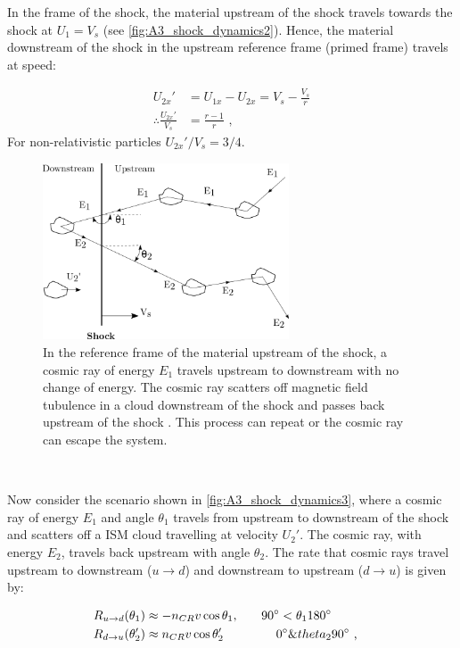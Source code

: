 In the frame of the shock, the material upstream of the shock travels towards the shock at $U_1=V_s$ (see \autoref{fig:A3_shock_dynamics2}). Hence, the material downstream of the shock in the upstream reference frame (primed frame) travels at speed:

\begin{equation}
    \begin{aligned}
        U_{2x}'&=U_{1x}-U_{2x} =V_s- \frac{V_s}{r} \\
        \therefore \frac{U_{2x}'}{V_s}&=\frac{r-1}{r}\text{ ,}
    \end{aligned} \label{eq:down_upstream_v_ratio}
\end{equation}
\noindent For non-relativistic particles ${U_{2x}'}/{V_s}=3/4$.
\begin{figure}
	\centering
	\includegraphics[width=0.65\textwidth]{A3_Diffusive_Shock_Acceleration/Images/dsa.png}
	\caption{In the reference frame of the material upstream of the shock, a cosmic ray of energy $E_1$ travels upstream to downstream with no change of energy. The cosmic ray scatters off magnetic field tubulence in a  cloud downstream of the shock and passes back upstream of the shock . This process can repeat or the cosmic ray can escape the system.}
	\label{fig:A3_shock_dynamics3}
\end{figure}
\par~\par 
Now consider the scenario shown in \autoref{fig:A3_shock_dynamics3}, where a cosmic ray of energy $E_1$ and angle $\theta_1$ travels from upstream to downstream of the shock and scatters off a ISM cloud travelling at velocity $U_2'$. The cosmic ray, with energy $E_2$, travels back upstream with angle $\theta_2$. The rate that cosmic rays travel upstream to downstream ($u\rightarrow d$) and downstream to upstream ($d\rightarrow u$) is given by:


\begin{alignat}{2}
    R_{u\rightarrow d}\qty(\theta_1)&\approx-n_{CR}v\cos\theta_1,\quad &\ang{90}<\theta_1\ang{180} \\
    R_{d\rightarrow u}\qty(\theta_2')&\approx n_{CR}v\cos\theta_2'\quad&\ang{0}\&theta_2&\ang{90} \text{ ,}
\end{alignat}


